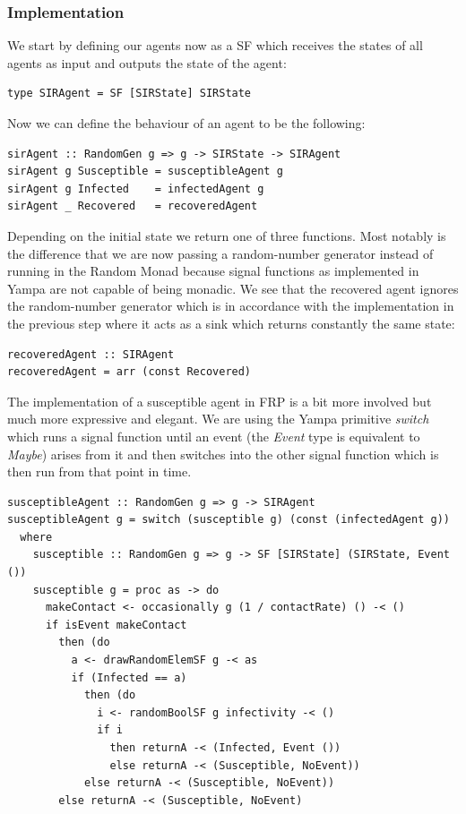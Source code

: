 \subsubsection{Implementation}
We start by defining our agents now as a SF which receives the states of all agents as input and outputs the state of the agent:

\begin{verbatim}
type SIRAgent = SF [SIRState] SIRState 
\end{verbatim}

Now we can define the behaviour of an agent to be the following:

\begin{verbatim}
sirAgent :: RandomGen g => g -> SIRState -> SIRAgent
sirAgent g Susceptible = susceptibleAgent g
sirAgent g Infected    = infectedAgent g
sirAgent _ Recovered   = recoveredAgent
\end{verbatim}

Depending on the initial state we return one of three functions. Most notably is the difference that we are now passing a random-number generator instead of running in the Random Monad because signal functions as implemented in Yampa are not capable of being monadic. We see that the recovered agent ignores the random-number generator which is in accordance with the implementation in the previous step where it acts as a sink which returns constantly the same state:

\begin{verbatim}
recoveredAgent :: SIRAgent
recoveredAgent = arr (const Recovered)
\end{verbatim}

The implementation of a susceptible agent in FRP is a bit more involved but much more expressive and elegant. We are using the Yampa primitive \textit{switch} which runs a signal function until an event (the \textit{Event} type is equivalent to \textit{Maybe}) arises from it and then switches into the other signal function which is then run from that point in time.

\begin{verbatim}
susceptibleAgent :: RandomGen g => g -> SIRAgent
susceptibleAgent g = switch (susceptible g) (const (infectedAgent g))
  where
    susceptible :: RandomGen g => g -> SF [SIRState] (SIRState, Event ())
    susceptible g = proc as -> do
      makeContact <- occasionally g (1 / contactRate) () -< ()
      if isEvent makeContact
        then (do
          a <- drawRandomElemSF g -< as
          if (Infected == a)
            then (do
              i <- randomBoolSF g infectivity -< ()
              if i
                then returnA -< (Infected, Event ())
                else returnA -< (Susceptible, NoEvent))
            else returnA -< (Susceptible, NoEvent))
        else returnA -< (Susceptible, NoEvent)
\end{verbatim}

